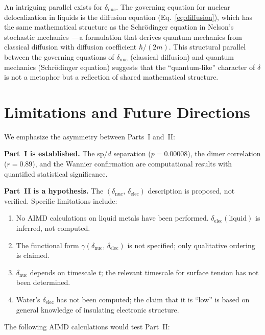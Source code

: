 \documentclass[twocolumn,showpacs,preprintnumbers,amsmath,amssymb,prb]{revtex4-2}
\begin{document}
An intriguing parallel exists for $\delta_\mathrm{nuc}$.
The governing equation for nuclear delocalization in
liquids is the diffusion equation
(Eq.~\eqref{eq:diffusion}), which has the same
mathematical structure as the Schr\"odinger equation
in Nelson's stochastic mechanics~\cite{Nelson1966}---a
formulation that derives quantum mechanics from
classical diffusion with diffusion coefficient
$\hbar/(2m)$.
This structural parallel between the governing equations
of $\delta_\mathrm{nuc}$ (classical diffusion) and
quantum mechanics (Schr\"odinger equation)
suggests that the ``quantum-like'' character of
$\delta$ is not a metaphor but a reflection of
shared mathematical structure.


\section{Limitations and Future Directions}
\label{sec:future}

We emphasize the asymmetry between Parts~I and~II:

\textbf{Part~I is established.}
The sp/$d$ separation ($p = 0.00008$), the dimer correlation
($r = 0.89$), and the Wannier confirmation are computational
results with quantified statistical significance.

\textbf{Part~II is a hypothesis.}
The $(\delta_\mathrm{nuc},\,\delta_\mathrm{elec})$ description
is proposed, not verified.
Specific limitations include:

\begin{enumerate}
  \item No AIMD calculations on liquid metals have been performed.
    $\delta_\mathrm{elec}(\mathrm{liquid})$ is inferred, not computed.
  \item The functional form
    $\gamma(\delta_\mathrm{nuc},\,\delta_\mathrm{elec})$
    is not specified; only qualitative ordering is claimed.
  \item $\delta_\mathrm{nuc}$ depends on timescale $t$;
    the relevant timescale for surface tension has not
    been determined.
  \item Water's $\delta_\mathrm{elec}$ has not been computed;
    the claim that it is ``low'' is based on general
    knowledge of insulating electronic structure.
\end{enumerate}

The following AIMD calculations would test Part~II:
\end{document}
